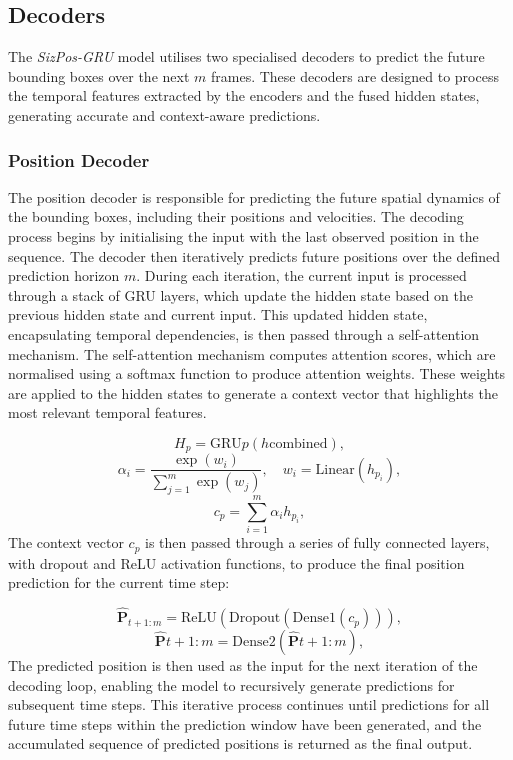 \documentclass[12pt,oneside]{book} %
\begin{document}
\subsection{Decoders}
\noindent The \textit{SizPos-GRU} model utilises two specialised decoders to predict the
future bounding boxes over the next \(m\) frames. These decoders are designed
to process the temporal features extracted by the encoders and the fused hidden
states, generating accurate and context-aware predictions.

\subsubsection*{Position Decoder}
\noindent The position decoder is responsible for predicting the future spatial dynamics
of the bounding boxes, including their positions and velocities. The decoding
process begins by initialising the input with the last observed position in the
sequence. The decoder then iteratively predicts future positions over the
defined prediction horizon \(m\). During each iteration, the current input is processed through a stack of GRU
layers, which update the hidden state based on the previous hidden state and
current input. This updated hidden state, encapsulating temporal dependencies,
is then passed through a self-attention mechanism. The self-attention mechanism
computes attention scores, which are normalised using a softmax function to
produce attention weights. These weights are applied to the hidden states to
generate a context vector that highlights the most relevant temporal features.

\begin{equation}
    H_p = \text{GRU}p(h{\text{combined}}),
\end{equation}
\begin{equation}
    \alpha_i = \frac{\exp(w_i)}{\sum_{j=1}^{m}\exp(w_j)}, \quad w_i = \text{Linear}(h_{p_i}),
\end{equation}
\begin{equation}
    c_p = \sum_{i=1}^{m} \alpha_i h_{p_i},
\end{equation}
The context vector $c_p$ is then passed through a series of fully connected
layers, with dropout and ReLU activation functions, to produce the final
position prediction for the current time step:

\begin{equation}
    \hat{\mathbf{P}}_{t+1:m} = \text{ReLU}(\text{Dropout}(\text{Dense}1(c_p))),
\end{equation}
\begin{equation}
    \hat{\mathbf{P}}{t+1:m} = \text{Dense}2(\hat{\mathbf{P}}{t+1:m}),
\end{equation}
The predicted position is then used as the input for the next iteration of the
decoding loop, enabling the model to recursively generate predictions for
subsequent time steps. This iterative process continues until predictions for
all future time steps within the prediction window have been generated, and the
accumulated sequence of predicted positions is returned as the final output.
\end{document}

